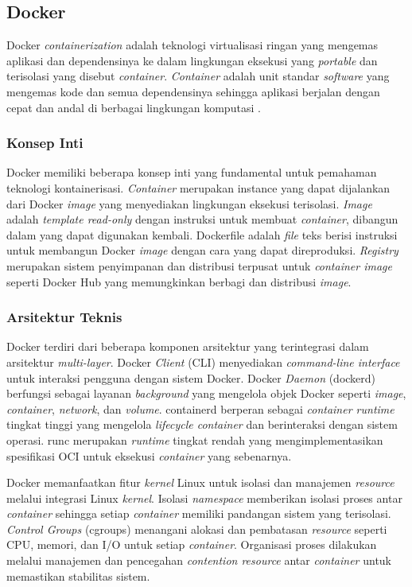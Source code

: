 \subsection{Docker}
\label{subsec:docker}

Docker \emph{containerization} adalah teknologi virtualisasi ringan yang mengemas aplikasi dan dependensinya ke dalam lingkungan eksekusi yang \emph{portable} dan terisolasi yang disebut \emph{container}. \emph{Container} adalah unit standar \emph{software} yang mengemas kode dan semua dependensinya sehingga aplikasi berjalan dengan cepat dan andal di berbagai lingkungan komputasi \parencite{merkel2014docker}.

\subsubsection{Konsep Inti}

Docker memiliki beberapa konsep inti yang fundamental untuk pemahaman teknologi kontainerisasi. \emph{Container} merupakan instance yang dapat dijalankan dari Docker \emph{image} yang menyediakan lingkungan eksekusi terisolasi. \emph{Image} adalah \emph{template read-only} dengan instruksi untuk membuat \emph{container}, dibangun dalam \layer yang dapat digunakan kembali. Dockerfile adalah \emph{file} teks berisi instruksi untuk membangun Docker \emph{image} dengan cara yang dapat direproduksi. \emph{Registry} merupakan sistem penyimpanan dan distribusi terpusat untuk \emph{container image} seperti Docker Hub yang memungkinkan berbagi dan distribusi \emph{image}.

\subsubsection{Arsitektur Teknis}

Docker terdiri dari beberapa komponen arsitektur yang terintegrasi dalam arsitektur \emph{multi-layer}. Docker \emph{Client} (CLI) menyediakan \emph{command-line interface} untuk interaksi pengguna dengan sistem Docker. Docker \emph{Daemon} (dockerd) berfungsi sebagai layanan \emph{background} yang mengelola objek Docker seperti \emph{image}, \emph{container}, \emph{network}, dan \emph{volume}. containerd berperan sebagai \emph{container runtime} tingkat tinggi yang mengelola \emph{lifecycle container} dan berinteraksi dengan sistem operasi. runc merupakan \emph{runtime} tingkat rendah yang mengimplementasikan spesifikasi OCI untuk eksekusi \emph{container} yang sebenarnya.

Docker memanfaatkan fitur \emph{kernel} Linux untuk isolasi dan manajemen \emph{resource} melalui integrasi Linux \emph{kernel}. Isolasi \emph{namespace} memberikan isolasi proses antar \emph{container} sehingga setiap \emph{container} memiliki pandangan sistem yang terisolasi. \emph{Control Groups} (cgroups) menangani alokasi dan pembatasan \emph{resource} seperti CPU, memori, dan I/O untuk setiap \emph{container}. Organisasi proses dilakukan melalui manajemen dan pencegahan \emph{contention resource} antar \emph{container} untuk memastikan stabilitas sistem.

